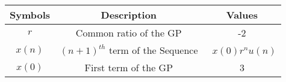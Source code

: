 \begin{enumerate}
\begin{tabular}{ |c|c|c| } 
 \hline
Symbols & Description & Values  \\
\hline
 $r$ & Common ratio of the GP & -2\\
 \hline

  $x(n)$ & $(n+1)^{th}$ term of the Sequence & \ $x(0)r^{n}u(n)$\\
  \hline


  $x(0)$ & First term of the GP & 3\\
\hline
  
   \hline
\end{tabular}
\end{enumerate}
\centering
\captionsetup{Table 1 : Parameters , Descriptions And Values }
\label{table:ee25-tab2}
